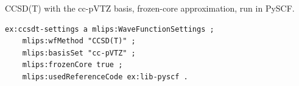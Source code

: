 CCSD(T) with the cc-pVTZ basis, frozen-core approximation, run in PySCF.
\begin{lstlisting}[language=turtle]
ex:ccsdt-settings a mlips:WaveFunctionSettings ;
    mlips:wfMethod "CCSD(T)" ;
    mlips:basisSet "cc-pVTZ" ;
    mlips:frozenCore true ;
    mlips:usedReferenceCode ex:lib-pyscf .
\end{lstlisting}
